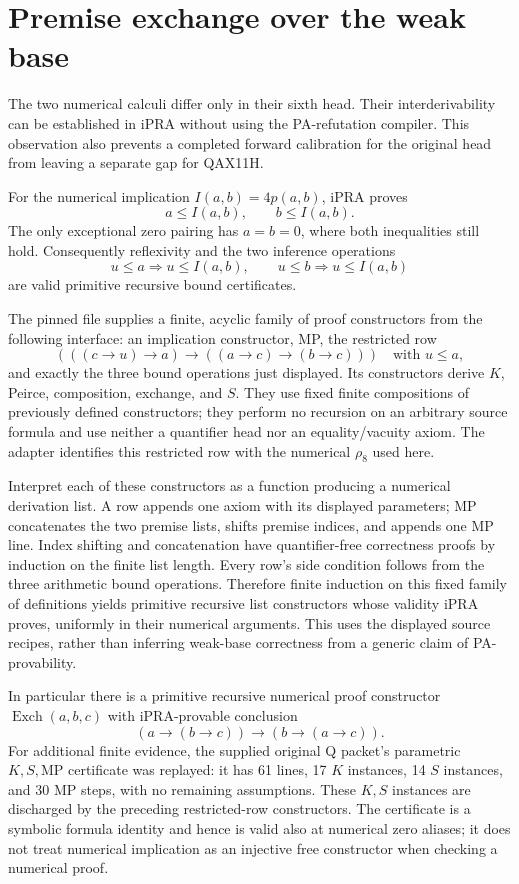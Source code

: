\section{Premise exchange over the weak base}
\label{sec:q-exchange-ipra}

The two numerical calculi differ only in their sixth head.  Their
interderivability can be established in iPRA without using the
PA-refutation compiler.  This observation also prevents a completed
forward calibration for the original head from leaving a separate gap
for QAX11H.

For the numerical implication $I(a,b)=4p(a,b)$, iPRA proves
\[
 a\le I(a,b),\qquad b\le I(a,b).
\]
The only exceptional zero pairing has $a=b=0$, where both inequalities
still hold.  Consequently reflexivity and the two inference operations
\[
 u\le a\Longrightarrow u\le I(a,b),\qquad
 u\le b\Longrightarrow u\le I(a,b)
\]
are valid primitive recursive bound certificates.

The pinned file  supplies a
finite, acyclic family of proof constructors from the following interface:
an implication constructor, MP, the restricted row
\[
 (((c\to u)\to a)\to((a\to c)\to(b\to c)))
 \quad\text{with }u\le a,
\]
and exactly the three bound operations just displayed.  Its constructors
derive $K$, Peirce, composition, exchange, and $S$.  They use fixed finite
compositions of previously defined constructors; they perform no recursion
on an arbitrary source formula and use neither a quantifier head nor an
equality/vacuity axiom.  The adapter
 identifies this restricted row
with the numerical $\rho_8$ used here\cite{q-basis}.

Interpret each of these constructors as a function producing a numerical
derivation list.  A row appends one axiom with its displayed parameters;
MP concatenates the two premise lists, shifts premise indices, and appends
one MP line.  Index shifting and concatenation have quantifier-free
correctness proofs by induction on the finite list length.  Every row's
side condition follows from the three arithmetic bound operations.
Therefore finite induction on this fixed family of definitions yields
primitive recursive list constructors whose validity iPRA proves,
uniformly in their numerical arguments.  This uses the displayed source
recipes, rather than inferring weak-base correctness from a generic
claim of PA-provability.

In particular there is a primitive recursive numerical proof constructor
$\operatorname{Exch}(a,b,c)$ with iPRA-provable conclusion
\[
 (a\to(b\to c))\to(b\to(a\to c)).                 \tag{Q-Ex}
\]
For additional finite evidence, the supplied original Q packet's
parametric $K,S,\mathrm{MP}$ certificate was replayed: it has 61 lines,
17 $K$ instances, 14 $S$ instances, and 30 MP steps, with no remaining
assumptions.  These $K,S$ instances are discharged by the preceding
restricted-row constructors.  The certificate is a symbolic formula
identity and hence is valid also at numerical zero aliases; it does not
treat numerical implication as an injective free constructor when
checking a numerical proof.

